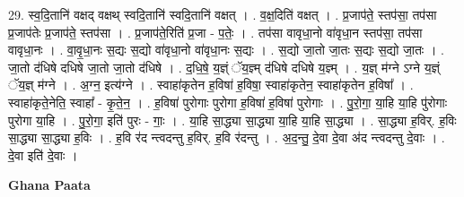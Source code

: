 \documentclass[17pt]{extarticle}
\begin{document}
29. स्व॒दि॒तानि॑ वक्षद् वक्षथ् स्वदि॒तानि॑ स्वदि॒तानि॑ वक्षत् । . व॒क्ष॒दिति॑ वक्षत् । . प्र॒जाप॑ते॒ स्तप॑सा॒ तप॑सा प्र॒जाप॑तेः प्र॒जाप॑ते॒ स्तप॑सा । . प्र॒जाप॑ते॒रिति॑ प्र॒जा - प॒तेः॒ । . तप॑सा वावृधा॒नो वा॑वृधा॒न स्तप॑सा॒ तप॑सा वावृधा॒नः । . वा॒वृ॒धा॒नः स॒द्यः स॒द्यो वा॑वृधा॒नो वा॑वृधा॒नः स॒द्यः । . स॒द्यो जा॒तो जा॒तः स॒द्यः स॒द्यो जा॒तः । . जा॒तो द॑धिषे दधिषे जा॒तो जा॒तो द॑धिषे । . द॒धि॒षे॒ य॒ज्ञ्ं ॅय॒ज्ञ्म् द॑धिषे दधिषे य॒ज्ञ्म् । . य॒ज्ञ् म॑ग्ने ऽग्ने य॒ज्ञ्ं ॅय॒ज्ञ् म॑ग्ने । . अ॒ग्न॒ इत्य॑ग्ने । . स्वाहा॑कृतेन ह॒विषा॑ ह॒विषा॒ स्वाहा॑कृतेन॒ स्वाहा॑कृतेन ह॒विषा᳚ । . स्वाहा॑कृते॒नेति॒ स्वाहा᳚ - कृ॒ते॒न॒ । . ह॒विषा॑ पुरोगाः पुरोगा ह॒विषा॑ ह॒विषा॑ पुरोगाः । . पु॒रो॒गा॒ या॒हि या॒हि पु॑रोगाः पुरोगा या॒हि । . पु॒रो॒गा॒ इति॑ पुरः - गाः॒ । . या॒हि सा॒द्ध्या सा॒द्ध्या या॒हि या॒हि सा॒द्ध्या । . सा॒द्ध्या ह॒विर्. ह॒विः सा॒द्ध्या सा॒द्ध्या ह॒विः । . ह॒वि र॑द न्त्वदन्तु ह॒विर्. ह॒वि र॑दन्तु । . अ॒द॒न्तु॒ दे॒वा दे॒वा अ॑द न्त्वदन्तु दे॒वाः । . दे॒वा इति॑ दे॒वाः । \newline

\textbf{Ghana Paata } \newline
\end{document}
